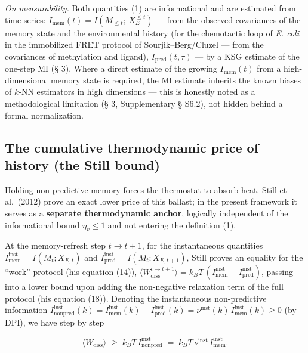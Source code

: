 \documentclass[pdflatex,sn-mathphys-ay]{sn-jnl}
\begin{document}
\emph{On measurability.} Both quantities (1) are informational and are estimated from time series: \(I_{\text{mem}}(t) = I(M_{\le t};\, X_E^{\le t})\) --- from the observed covariances of the memory state and the environmental history (for the chemotactic loop of \emph{E. coli} in the immobilized FRET protocol of Sourjik--Berg/Cluzel --- from the covariances of methylation and ligand), \(I_{\text{pred}}(t,\tau)\) --- by a KSG estimate of the one-step MI (§ 3). Where a direct estimate of the growing \(I_{\text{mem}}(t)\) from a high-dimensional memory state is required, the MI estimate inherits the known biases of \(k\)-NN estimators in high dimensions --- this is honestly noted as a methodological limitation (§ 3, Supplementary § S6.2), not hidden behind a formal normalization.



\subsection{The cumulative thermodynamic price of history (the Still bound)}\label{the-cumulative-thermodynamic-price-of-history-the-still-bound}



Holding non-predictive memory forces the thermostat to absorb heat. Still et al.~(2012) prove an exact lower price of this ballast; in the present framework it serves as a \textbf{separate thermodynamic anchor}, logically independent of the informational bound \(\eta_v \le 1\) and not entering the definition (1).



At the memory-refresh step \(t \to t+1\), for the instantaneous quantities \(I_{\text{mem}}^{\text{inst}} = I(M_t; X_{E,t})\) and \(I_{\text{pred}}^{\text{inst}} = I(M_t; X_{E,t+1})\), Still proves an equality for the ``work'' protocol (his equation (14)), \(\langle W_{\text{diss}}^{t\to t+1}\rangle = k_B T\,(I_{\text{mem}}^{\text{inst}} - I_{\text{pred}}^{\text{inst}})\), passing into a lower bound upon adding the non-negative relaxation term of the full protocol (his equation (18)). Denoting the instantaneous non-predictive information \(I_{\text{nonpred}}^{\text{inst}}(k) = I_{\text{mem}}^{\text{inst}}(k) - I_{\text{pred}}^{\text{inst}}(k) = \nu^{\text{inst}}(k)\, I_{\text{mem}}^{\text{inst}}(k) \ge 0\) (by DPI), we have step by step



\begin{equation}\langle W_{\text{diss}} \rangle \;\ge\; k_B T\, I_{\text{nonpred}}^{\text{inst}} \;=\; k_B T\, \nu^{\text{inst}}\, I_{\text{mem}}^{\text{inst}}. \tag{2}\end{equation}
\end{document}

